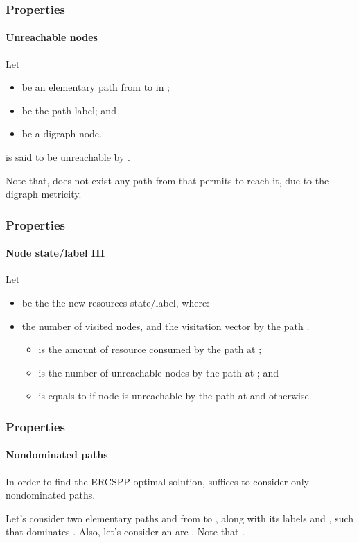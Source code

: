 \begin{frame}
  \frametitle{Properties}
  \framesubtitle{Unreachable nodes}
  Let
  \begin{itemize}
    \item {} be an elementary path from  to  in ; 
    \item {} be the path label; and
    \item {} be a digraph node.
  \end{itemize}
  \begin{definition}
     is said to be unreachable by .
  \end{definition}
  Note that, does not exist any path from  that permits to reach it, due to the digraph metricity.
\end{frame}

\begin{frame}
  \frametitle{Properties}
  \framesubtitle{Node state/label III}
  Let
  \begin{itemize}
    \item {} be the the new resources state/label, where:
      \item the number of visited nodes, and the visitation vector by the path .
    \begin{itemize}
      \item {} is the amount of resource  consumed by the path  at ;
      \item {} is the number of unreachable nodes by the path  at ; and 
      \item {} is equals to  if node  is unreachable by the path  at  and  otherwise.
    \end{itemize}
  \end{itemize}
\end{frame}

\begin{frame}
  \frametitle{Properties}
  \framesubtitle{Nondominated paths}
  \begin{claim}
    In order to find the ERCSPP optimal solution, suffices to consider only nondominated paths.
  \end{claim}
  \begin{claimproof}
    Let's consider two elementary paths  and  from  to , along with its labels  and , such that  dominates .
    Also, let's consider an arc .
    Note that .
  \end{claimproof}
\end{frame}
